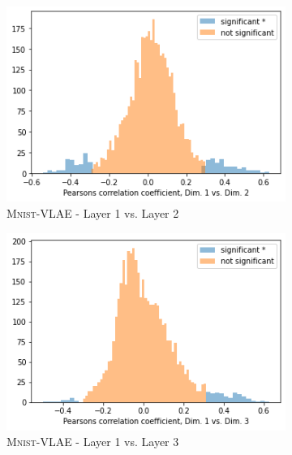 \begin{figure}
    \centering
    \begin{subfigure}{.3\textwidth}
        \includegraphics[width=\textwidth]{images/notprop/dsprites/vlae/dim_1_2.png}
        \caption{\textsc{Mnist}-\ac{VLAE} - Layer 1 vs. Layer 2}
    \end{subfigure}
    \hfill
    \begin{subfigure}{.3\textwidth}
        \includegraphics[width=\textwidth]{images/notprop/dsprites/vlae/dim_1_3.png}
        \caption{\textsc{Mnist}-\ac{VLAE} - Layer 1 vs. Layer 3}
    \end{subfigure}
    \hfill
    \begin{subfigure}{.3\textwidth}

\end{subfigure}
\end{figure}
